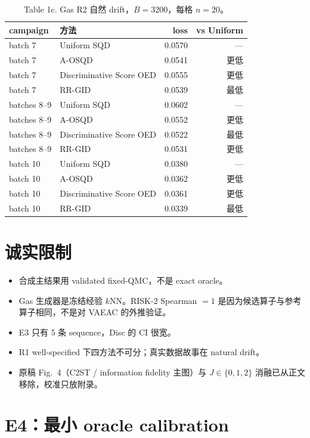 \documentclass[UTF8,a4paper,11pt]{ctexart}
\begin{document}
\begin{table}[H]
\centering\small
\caption{Table 1c. Gas R2 自然 drift，\(B=3200\)，每格 \(n=20\)。}
\begin{tabular}{llrr}
\toprule
campaign & 方法 & loss & vs Uniform \\
\midrule
batch 7 & Uniform SQD & 0.0570 & --- \\
batch 7 & A-OSQD & 0.0541 & 更低 \\
batch 7 & Discriminative Score OED & 0.0555 & 更低 \\
batch 7 & RR-GID & 0.0539 & 最低 \\
batches 8--9 & Uniform SQD & 0.0602 & --- \\
batches 8--9 & A-OSQD & 0.0552 & 更低 \\
batches 8--9 & Discriminative Score OED & 0.0522 & 最低 \\
batches 8--9 & RR-GID & 0.0531 & 更低 \\
batch 10 & Uniform SQD & 0.0380 & --- \\
batch 10 & A-OSQD & 0.0362 & 更低 \\
batch 10 & Discriminative Score OED & 0.0361 & 更低 \\
batch 10 & RR-GID & 0.0339 & 最低 \\
\bottomrule
\end{tabular}
\end{table}

\section{诚实限制}

\begin{itemize}
\item 合成主结果用 validated fixed-QMC，不是 exact oracle。
\item Gas 生成器是冻结经验 \(k\)NN。RISK-2 Spearman \(=1\) 是因为候选算子与参考算子相同，不是对 VAEAC 的外推验证。
\item E3 只有 5 条 sequence，Disc 的 CI 很宽。
\item R1 well-specified 下四方法不可分；真实数据故事在 natural drift。
\item 原稿 Fig.~4（C2ST / information fidelity 主图）与 \(J\in\{0,1,2\}\) 消融已从正文移除，校准只放附录。
\end{itemize}

\clearpage
\appendix
\section{E4：最小 oracle calibration}
\end{document}
